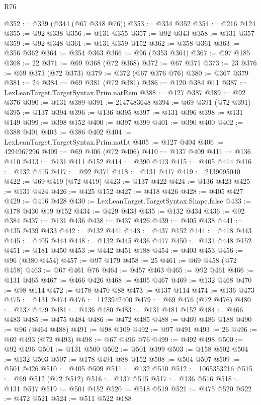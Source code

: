 \begin{lexlean}{R76}
\begin{coremodule}
@352 := @339 (@344 (@67 @348 @76))
@353 := @334 @352
@354 := @216 @124
@355 := @92 @338
@356 := @131 @355
@357 := @92 @343
@358 := @131 @357
@359 := @92 @348
@361 := @131 @359 @152
@362 := @358 @361
@363 := @356 @362
@364 := @354 @363
@366 := @96 (@353 @364)
@367 := @97 @185
@368 := 22
@371 := @69 @368 (@72 @368)
@372 := @67 @371
@373 := 23
@376 := @69 @373 (@72 @373)
@379 := @372 (@67 @376 @76)
@380 := @367 @379
@381 := 24
@384 := @69 @381 (@72 @381)
@386 := @120 @384 @11
@387 := LexLeanTarget.TargetSyntax.Prim.natRem
@388 := @127 @387
@389 := @92 @376
@390 := @131 @389
@391 := 2147483648
@394 := @69 @391 (@72 @391)
@395 := @137 @394
@396 := @136 @395
@397 := @131 @396
@398 := @131 @149
@399 := @398 @152
@400 := @397 @399
@401 := @390 @400
@402 := @388 @401
@403 := @386 @402
@404 := LexLeanTarget.TargetSyntax.Prim.natLt
@405 := @127 @404
@406 := 4294967296
@409 := @69 @406 (@72 @406)
@410 := @137 @409
@411 := @136 @410
@413 := @131 @411 @152
@414 := @390 @413
@415 := @405 @414
@416 := @132 @415
@417 := @92 @371
@418 := @131 @417
@419 := 2139095040
@422 := @69 @419 (@72 @419)
@423 := @137 @422
@424 := @136 @423
@425 := @131 @424
@426 := @425 @152
@427 := @418 @426
@428 := @405 @427
@429 := @416 @428
@430 := LexLeanTarget.TargetSyntax.Shape.false
@433 := @178 @430 @19 @152
@434 := @429 @433
@435 := @132 @434
@436 := @92 @384
@437 := @131 @436
@438 := @437 @426
@439 := @405 @438
@441 := @435 @439 @433
@442 := @132 @441
@443 := @437 @152
@444 := @418 @443
@445 := @405 @444
@448 := @132 @445 @436 @417
@450 := @131 @448 @152
@451 := @181 @450
@453 := @442 @451 @188
@454 := @403 @453
@456 := @96 (@380 @454)
@457 := @97 @179
@458 := 25
@461 := @69 @458 (@72 @458)
@463 := @67 @461 @76
@464 := @457 @463
@465 := @92 @461
@466 := @131 @465
@467 := @466 @426
@468 := @405 @467
@469 := @132 @468
@470 := @98 @114
@472 := @178 @470 @88
@473 := @137 @114
@474 := @136 @473
@475 := @131 @474
@476 := 1123942400
@479 := @69 @476 (@72 @476)
@480 := @137 @479
@481 := @136 @480
@483 := @131 @481 @152
@484 := @466 @483
@485 := @475 @484
@486 := @472 @485
@488 := @469 @486 @188
@490 := @96 (@464 @488)
@491 := @98 @109
@492 := @97 @491
@493 := 26
@496 := @69 @493 (@72 @493)
@498 := @67 @496 @76
@499 := @492 @498
@500 := @92 @496
@501 := @131 @500
@502 := @501 @399
@503 := @158 @502
@504 := @132 @503
@507 := @178 @491 @88 @152
@508 := @504 @507
@509 := @501 @426
@510 := @405 @509
@511 := @132 @510
@512 := 1065353216
@515 := @69 @512 (@72 @512)
@516 := @137 @515
@517 := @136 @516
@518 := @131 @517
@519 := @501 @152
@520 := @518 @519
@521 := @475 @520
@522 := @472 @521
@524 := @511 @522 @188

\end{coremodule}
\end{lexlean}

